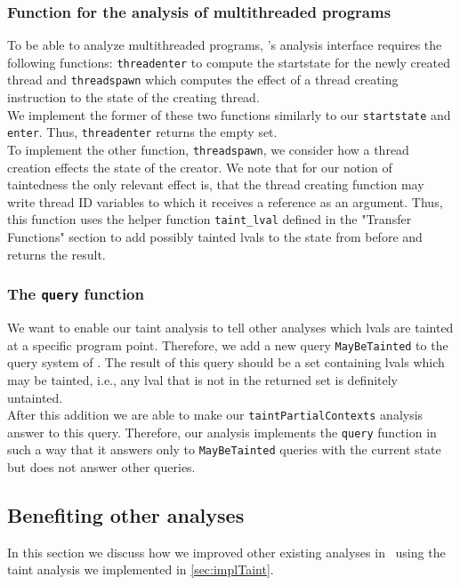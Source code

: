       \subsubsection{Function for the analysis of multithreaded programs}
        To be able to analyze multithreaded programs, \gob's analysis interface requires the following functions: \texttt{threadenter} to compute the startstate for the newly created thread and \texttt{threadspawn} which computes the effect of a thread creating instruction to the state of the creating thread.\\
        We implement the former of these two functions similarly to our \texttt{startstate} and \texttt{enter}. Thus, \texttt{threadenter} returns the empty set.\\
        To implement the other function, \texttt{threadspawn}, we consider how a thread creation effects the state of the creator. We note that for our notion of taintedness the only relevant effect is, that the thread creating function may write thread ID variables to which it receives a reference as an argument. Thus, this function uses the helper function \texttt{taint\_lval} defined in the "Transfer Functions" section to add possibly tainted \ac{lval}s to the state from before and returns the result.

      \subsubsection{The \texttt{query} function}
        We want to enable our taint analysis to tell other analyses which \ac{lval}s are tainted at a specific program point. Therefore, we add a new query \texttt{MayBeTainted} to the query system of \gob. The result of this query should be a set containing \ac{lval}s which may be tainted, i.e., any \ac{lval} that is not in the returned set is definitely untainted.\\
        After this addition we are able to make our \texttt{taintPartialContexts} analysis answer to this query. Therefore, our analysis implements the \texttt{query} function in such a way that it answers only to \texttt{MayBeTainted} queries with the current state but does not answer other queries.

    \subsection{Benefiting other analyses}\label{sec:improveVariableAnalyses}
    In this section we discuss how we improved other existing analyses in \gob\ using the taint analysis we implemented in \autoref{sec:implTaint}.
